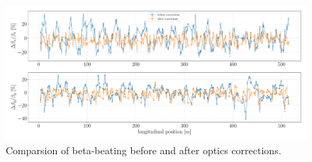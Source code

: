 \begin{figure}
\centering
\includegraphics[width=1.0\textwidth]{figures/beta_beating_progress2.pdf}
\caption{Comparsion of beta-beating before and after optics corrections.}
\label{fig:beta_beating_progress}
\end{figure}

